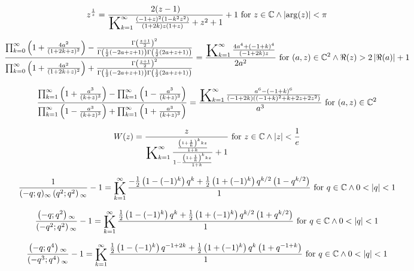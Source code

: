 \documentclass{article}
\newcommand{\bigK}{\mathop{\raisebox{-5pt}{\huge K}}}
\begin{document}
\[z^{\frac{1}{z}}=\frac{2 (z-1)}{\bigK_{k=1}^{\infty}\frac{(-1+z)^2 \left(1-k^2 z^2\right)}{(1+2 k) z (1+z)}+z^2+1}+1\text{ for }z\in \mathbb{C}\land \left| \arg (z)\right| <\pi\] 

\[\frac{\prod _{k=0}^{\infty } \left(1+\frac{4 a^2}{(1+2 k+z)^2}\right)-\frac{\Gamma \left(\frac{z+1}{2}\right)^2}{\Gamma \left(\frac{1}{2} (-2 a+z+1)\right) \Gamma \left(\frac{1}{2} (2 a+z+1)\right)}}{\prod _{k=0}^{\infty } \left(1+\frac{4 a^2}{(1+2 k+z)^2}\right)+\frac{\Gamma \left(\frac{z+1}{2}\right)^2}{\Gamma \left(\frac{1}{2} (-2 a+z+1)\right) \Gamma \left(\frac{1}{2} (2 a+z+1)\right)}}=\frac{\bigK_{k=1}^{\infty}\frac{4 a^4+(-1+k)^4}{(-1+2 k) z}}{2 a^2}\text{ for }(a,z)\in \mathbb{C}^2\land \Re(z)>2 \left| \Re(a)\right| +1\] 

\[\frac{\prod _{k=1}^{\infty } \left(1+\frac{a^3}{(k+z)^3}\right)-\prod _{k=1}^{\infty } \left(1-\frac{a^3}{(k+z)^3}\right)}{\prod _{k=1}^{\infty } \left(1-\frac{a^3}{(k+z)^3}\right)+\prod _{k=1}^{\infty } \left(1+\frac{a^3}{(k+z)^3}\right)}=\frac{\bigK_{k=1}^{\infty}\frac{a^6-(-1+k)^6}{(-1+2 k) \left((-1+k)^2+k+2 z+2 z^2\right)}}{a^3}\text{ for }(a,z)\in \mathbb{C}^2\] 

\[W(z)=\frac{z}{\bigK_{k=1}^{\infty}\frac{\frac{\left(1+\frac{1}{k}\right)^k k z}{1+k}}{1-\frac{\left(1+\frac{1}{k}\right)^k k z}{1+k}}+1}\text{ for }z\in \mathbb{C}\land \left| z\right| <\frac{1}{e}\] 

\[\frac{1}{(-q;q)_{\infty } \left(q^2;q^2\right){}_{\infty }}-1=\bigK_{k=1}^{\infty}\frac{-\frac{1}{2} \left(1-(-1)^k\right) q^k+\frac{1}{2} \left(1+(-1)^k\right) q^{k/2} \left(1-q^{k/2}\right)}{1}\text{ for }q\in \mathbb{C}\land 0<\left| q\right| <1\] 

\[\frac{\left(-q;q^2\right){}_{\infty }}{\left(-q^2;q^2\right){}_{\infty }}-1=\bigK_{k=1}^{\infty}\frac{\frac{1}{2} \left(1-(-1)^k\right) q^k+\frac{1}{2} \left(1+(-1)^k\right) q^{k/2} \left(1+q^{k/2}\right)}{1}\text{ for }q\in \mathbb{C}\land 0<\left| q\right| <1\] 

\[\frac{\left(-q;q^4\right){}_{\infty }}{\left(-q^3;q^4\right){}_{\infty }}-1=\bigK_{k=1}^{\infty}\frac{\frac{1}{2} \left(1-(-1)^k\right) q^{-1+2 k}+\frac{1}{2} \left(1+(-1)^k\right) q^k \left(1+q^{-1+k}\right)}{1}\text{ for }q\in \mathbb{C}\land 0<\left| q\right| <1\] 
\end{document}
